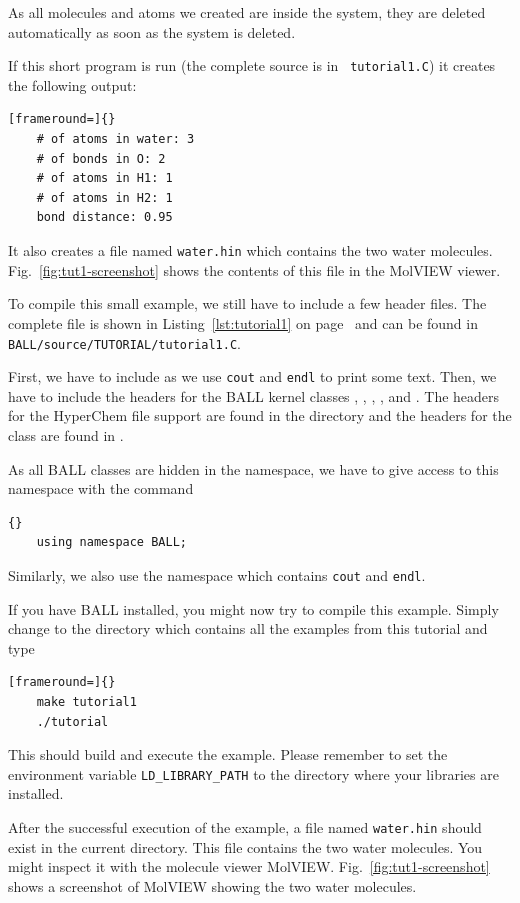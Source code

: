 \noindent 
As all molecules and atoms we created are inside the system, they are deleted
automatically as soon as the system is deleted.

If this short program is run (the complete source is in {\tt
tutorial1.C}) it creates the following output:

\begin{lstlisting}[frameround=]{}
	# of atoms in water: 3
	# of bonds in O: 2
	# of atoms in H1: 1
	# of atoms in H2: 1
	bond distance: 0.95
\end{lstlisting}

\noindent
It also creates a file named {\tt water.hin} which contains the two water
molecules. Fig.~\ref{fig:tut1-screenshot} shows the contents of this file
in the MolVIEW viewer.

To compile this small example, we still have to include a few header files.
The complete file is shown in Listing~\ref{lst:tutorial1} on
page~\pageref{lst:tutorial1} and can be found in \mbox{{\tt
BALL/source/TUTORIAL/tutorial1.C}}.

First, we have to include  as we use {\tt cout} and {\tt endl}
to print some text. Then, we have to include the headers for the BALL kernel
classes , , , , and
. The headers for the HyperChem file support are found in the
directory  and the headers for the
 class are found in
.

As all BALL classes are hidden in the  namespace, we have to
give access to this namespace with the command 
\begin{lstlisting}{}
	using namespace BALL;
\end{lstlisting}
Similarly, we also use the namespace  which contains {\tt cout}
and {\tt endl}.

If you have BALL installed, you might now try to compile this example. Simply
change to the directory  which contains all
the examples from this tutorial and type 
\begin{lstlisting}[frameround=]{}
	make tutorial1
	./tutorial
\end{lstlisting}
This should build and execute the example. Please remember to set the
environment variable {\tt LD\_LIBRARY\_PATH} to the directory where your
libraries are installed.

After the successful execution of the example, a file named {\tt water.hin}
should exist in the current directory. This file contains the two water
molecules. You might inspect it with the molecule viewer MolVIEW.
Fig.~\ref{fig:tut1-screenshot} shows a screenshot of MolVIEW showing the two
water molecules.

